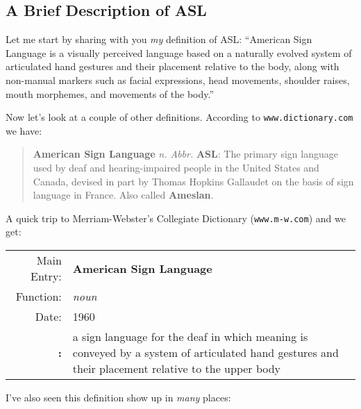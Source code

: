 \documentclass{article}
\begin{document}
\subsection{A Brief Description of ASL}

Let me start by sharing with you \emph{my} definition of ASL:
``American Sign Language is a visually perceived language based on a naturally evolved system of articulated hand gestures and their placement relative to the body, along with non-manual markers such as facial expressions, head movements, shoulder raises, mouth morphemes, and movements of the body.''

Now let's look at a couple of other definitions.
According to \texttt{www.dictionary.com} we have:

\begin{quote}
\textbf{American Sign Language} \textit{n. Abbr.} \textbf{ASL}:
The primary sign language used by deaf and hearing-impaired people in the United States and Canada, devised in part by Thomas Hopkins Gallaudet on the basis of sign language in France.
Also called \textbf{Ameslan}.
\end{quote}

A quick trip to Merriam-Webster's Collegiate Dictionary (\texttt{www.m-w.com}) and we get:

\begin{tabular}{rp{10cm}}
Main Entry:&\textbf{American Sign Language}\\
Function:&\emph{noun}\\
Date:&1960\\
\textbf{:}&a sign language for the deaf in which meaning is conveyed by a system of articulated hand gestures and their placement relative to the upper body\\
\end{tabular}

I've also seen this definition show up in \emph{many} places:
\end{document}
